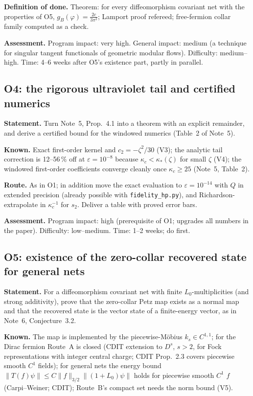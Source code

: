 \documentclass[11pt]{article}
\theoremstyle{accent}
\theoremstyle{definition}
\newcommand{\eps}{\varepsilon}
\begin{document}
\textbf{Definition of done.} Theorem: for every diffeomorphism covariant net with the properties of O5, \(g_B(\varphi)=\frac{2c}{3\pi^2}\); Lamport proof refereed; free-fermion collar family computed as a check.

\textbf{Assessment.} Program impact: very high.  General impact: medium (a technique for singular tangent functionals of geometric modular flows).  Difficulty: medium--high.  Time: 4--6 weeks after O5's existence part, partly in parallel.

\subsection{O4: the rigorous ultraviolet tail and certified numerics}\label{sec:O4}
\textbf{Statement.} Turn Note~5, Prop.~4.1 into a theorem with an explicit remainder, and derive a certified bound for the windowed numerics (Table~2 of Note~5).

\textbf{Known.} Exact first-order kernel and \(c_2=-\zeta^2/30\) (V3); the analytic tail correction is 12--56\,\% off at \(\eps=10^{-8}\) because \(\kappa_c<\kappa_*(\zeta)\) for small \(\zeta\) (V4); the windowed first-order coefficients converge cleanly once \(\kappa_c\ge25\) (Note~5, Table~2).

\textbf{Route.} As in O1; in addition move the exact evaluation to \(\eps=10^{-14}\) with \(Q\) in extended precision (already possible with \texttt{fidelity\_hp.py}), and Richardson-extrapolate in \(\kappa_c^{-1}\) for \(s_2\).  Deliver a table with proved error bars.

\textbf{Assessment.} Program impact: high (prerequisite of O1; upgrades all numbers in the paper).  Difficulty: low--medium.  Time: 1--2 weeks; do first.

\subsection{O5: existence of the zero-collar recovered state for general nets}\label{sec:O5}
\textbf{Statement.} For a diffeomorphism covariant net with finite \(L_0\)-multiplicities (and strong additivity), prove that the zero-collar Petz map exists as a normal map and that the recovered state is the vector state of a finite-energy vector, as in Note~6, Conjecture~3.2.

\textbf{Known.} The map is implemented by the piecewise-M\"obius \(k_s\in C^{1,1}\); for the Dirac fermion Route~A is closed (CDIT extension to \(D^s\), \(s>2\), for Fock representations with integer central charge; CDIT Prop.~2.3 covers piecewise smooth \(C^1\) fields); for general nets the energy bound \(\|T(f)\psi\|\le C\|f\|_{3/2}\|(1+L_0)\psi\|\) holds for piecewise smooth \(C^1\) \(f\) (Carpi--Weiner; CDIT); Route~B's compact set needs the norm bound (V5).
\end{document}
